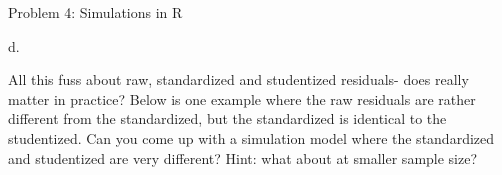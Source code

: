 \documentclass[ignorenonframetext,]{beamer}
\newenvironment{Shaded}{\begin{snugshade}}{\end{snugshade}}
\newcommand{\KeywordTok}[1]{\textcolor[rgb]{0.13,0.29,0.53}{\textbf{#1}}}
\newcommand{\DataTypeTok}[1]{\textcolor[rgb]{0.13,0.29,0.53}{#1}}
\newcommand{\DecValTok}[1]{\textcolor[rgb]{0.00,0.00,0.81}{#1}}
\newcommand{\StringTok}[1]{\textcolor[rgb]{0.31,0.60,0.02}{#1}}
\newcommand{\OperatorTok}[1]{\textcolor[rgb]{0.81,0.36,0.00}{\textbf{#1}}}
\newcommand{\NormalTok}[1]{#1}
\begin{document}
\begin{frame}[fragile]
\begin{block}{Problem 4: Simulations in R}
\begin{block}{d.}

All this fuss about raw, standardized and studentized residuals- does
really matter in practice? Below is one example where the raw residuals
are rather different from the standardized, but the standardized is
identical to the studentized. Can you come up with a simulation model
where the standardized and studentized are very different? Hint: what
about at smaller sample size?

\begin{Shaded}
\end{Shaded}

\end{block}

\end{block}

\end{frame}
\end{document}
